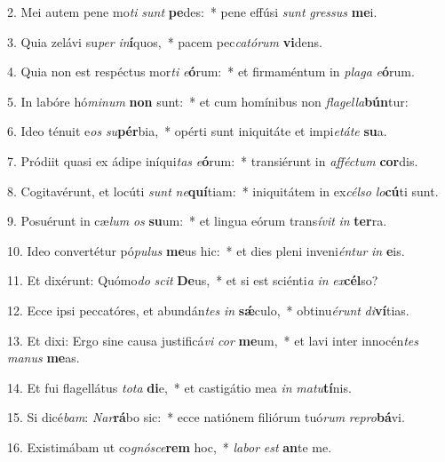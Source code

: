 2. Mei autem pene mo\textit{ti} \textit{sunt} \textbf{pe}des:~*  pene effúsi \textit{sunt} \textit{gres}\textit{sus} \textbf{me}i.\

3. Quia zelávi su\textit{per} \textit{in}\textbf{í}quos,~*  pacem pec\textit{ca}\textit{tó}\textit{rum} \textbf{vi}dens.\

4. Quia non est respéctus mor\textit{ti} \textit{e}\textbf{ó}rum:~*  et firmaméntum in \textit{pla}\textit{ga} \textit{e}\textbf{ó}rum.\

5. In labóre hó\textit{mi}\textit{num} \textbf{non} sunt:~*  et cum homínibus non \textit{fla}\textit{gel}\textit{la}\textbf{bún}tur:\

6. Ideo ténuit e\textit{os} \textit{su}\textbf{pér}bia,~*  opérti sunt iniquitáte et impi\textit{e}\textit{tá}\textit{te} \textbf{su}a.\

7. Pródiit quasi ex ádipe iníqui\textit{tas} \textit{e}\textbf{ó}rum:~*  transiérunt in \textit{af}\textit{féc}\textit{tum} \textbf{cor}dis.\

8. Cogitavérunt, et locúti \textit{sunt} \textit{ne}\textbf{quí}tiam:~*  iniquitátem in ex\textit{cél}\textit{so} \textit{lo}\textbf{cú}ti sunt.\

9. Posuérunt in cæ\textit{lum} \textit{os} \textbf{su}um:~*  et lingua eórum trans\textit{í}\textit{vit} \textit{in} \textbf{ter}ra.\

10. Ideo convertétur pó\textit{pu}\textit{lus} \textbf{me}us hic:~*  et dies pleni inveni\textit{én}\textit{tur} \textit{in} \textbf{e}is.\

11. Et dixérunt: Quómo\textit{do} \textit{scit} \textbf{De}us,~*  et si est sciénti\textit{a} \textit{in} \textit{ex}\textbf{cél}so?\

12. Ecce ipsi peccatóres, et abundán\textit{tes} \textit{in} \textbf{sǽ}culo,~*  obtinu\textit{é}\textit{runt} \textit{di}\textbf{ví}tias.\

13. Et dixi: Ergo sine causa justificá\textit{vi} \textit{cor} \textbf{me}um,~*  et lavi inter innocén\textit{tes} \textit{ma}\textit{nus} \textbf{me}as.\

14. Et fui flagellátus \textit{to}\textit{ta} \textbf{di}e,~*  et castigátio mea \textit{in} \textit{ma}\textit{tu}\textbf{tí}nis.\

15. Si dicé\textit{bam}: \textit{Nar}\textbf{rá}bo sic:~*  ecce natiónem filiórum tuó\textit{rum} \textit{re}\textit{pro}\textbf{bá}vi.\

16. Existimábam ut co\textit{gnó}\textit{sce}\textbf{rem} hoc,~*  \textit{la}\textit{bor} \textit{est} \textbf{an}te me.\

